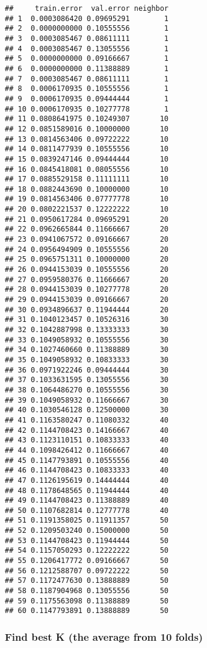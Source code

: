 \documentclass[]{article}
\begin{document}
\begin{verbatim}
##     train.error  val.error neighbor
## 1  0.0003086420 0.09695291        1
## 2  0.0000000000 0.10555556        1
## 3  0.0003085467 0.08611111        1
## 4  0.0003085467 0.13055556        1
## 5  0.0000000000 0.09166667        1
## 6  0.0000000000 0.11388889        1
## 7  0.0003085467 0.08611111        1
## 8  0.0006170935 0.10555556        1
## 9  0.0006170935 0.09444444        1
## 10 0.0006170935 0.10277778        1
## 11 0.0808641975 0.10249307       10
## 12 0.0851589016 0.10000000       10
## 13 0.0814563406 0.09722222       10
## 14 0.0811477939 0.10555556       10
## 15 0.0839247146 0.09444444       10
## 16 0.0845418081 0.08055556       10
## 17 0.0885529158 0.11111111       10
## 18 0.0882443690 0.10000000       10
## 19 0.0814563406 0.07777778       10
## 20 0.0802221537 0.12222222       10
## 21 0.0950617284 0.09695291       20
## 22 0.0962665844 0.11666667       20
## 23 0.0941067572 0.09166667       20
## 24 0.0956494909 0.10555556       20
## 25 0.0965751311 0.10000000       20
## 26 0.0944153039 0.10555556       20
## 27 0.0959580376 0.11666667       20
## 28 0.0944153039 0.10277778       20
## 29 0.0944153039 0.09166667       20
## 30 0.0934896637 0.11944444       20
## 31 0.1040123457 0.10526316       30
## 32 0.1042887998 0.13333333       30
## 33 0.1049058932 0.10555556       30
## 34 0.1027460660 0.11388889       30
## 35 0.1049058932 0.10833333       30
## 36 0.0971922246 0.09444444       30
## 37 0.1033631595 0.13055556       30
## 38 0.1064486270 0.10555556       30
## 39 0.1049058932 0.11666667       30
## 40 0.1030546128 0.12500000       30
## 41 0.1163580247 0.11080332       40
## 42 0.1144708423 0.14166667       40
## 43 0.1123110151 0.10833333       40
## 44 0.1098426412 0.11666667       40
## 45 0.1147793891 0.10555556       40
## 46 0.1144708423 0.10833333       40
## 47 0.1126195619 0.14444444       40
## 48 0.1178648565 0.11944444       40
## 49 0.1144708423 0.11388889       40
## 50 0.1107682814 0.12777778       40
## 51 0.1191358025 0.11911357       50
## 52 0.1209503240 0.15000000       50
## 53 0.1144708423 0.11944444       50
## 54 0.1157050293 0.12222222       50
## 55 0.1206417772 0.09166667       50
## 56 0.1212588707 0.09722222       50
## 57 0.1172477630 0.13888889       50
## 58 0.1187904968 0.13055556       50
## 59 0.1175563098 0.11388889       50
## 60 0.1147793891 0.13888889       50
\end{verbatim}

\hypertarget{find-best-k-the-average-from-10-folds}{%
\subsubsection{Find best K (the average from 10
folds)}\label{find-best-k-the-average-from-10-folds}}
\end{document}
